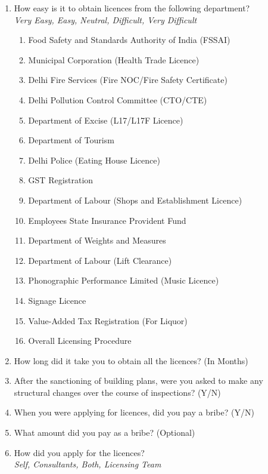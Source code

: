 \documentclass[a4paper, 12pt]{article}
\begin{document}
\begin{mdframed}[backgroundcolor=gray!20]
		\begin {enumerate}[nosep]
		\item How easy is it to obtain licences from the following department?\\ 
		\textit{Very Easy, Easy, Neutral, Difficult, Very Difficult}
			\begin {enumerate}[nosep]
			\item Food Safety and Standards Authority of India (FSSAI)
			\item Municipal Corporation (Health Trade Licence)
			\item Delhi Fire Services (Fire NOC/Fire Safety Certificate)
			\item Delhi Pollution Control Committee (CTO/CTE)
			\item Department of Excise (L17/L17F Licence)
			\item Department of Tourism
			\item Delhi Police (Eating House Licence)
			\item GST Registration
			\item Department of Labour (Shops and Establishment Licence)
			\item Employees State Insurance Provident Fund
			\item Department of Weights and Measures
			\item Department of Labour (Lift Clearance)
			\item Phonographic Performance Limited (Music Licence)
			\item Signage Licence
			\item Value-Added Tax Registration (For Liquor)
			\item Overall Licensing Procedure
			\end {enumerate}
		\item How long did it take you to obtain all the licences? (In Months)
		\item After the sanctioning of building plans, were you asked to make any structural changes over the course of inspections? (Y/N)
		\item When you were applying for licences, did you pay a bribe? (Y/N)
		\item What amount did you pay as a bribe? (Optional)
		\item How did you apply for the licences?\\
		\textit{Self, Consultants, Both, Licensing Team}
		\end {enumerate}


\end{mdframed}
\end{document}
